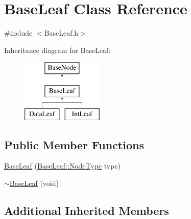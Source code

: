 \hypertarget{class_base_leaf}{\section{Base\-Leaf Class Reference}
\label{class_base_leaf}
}


{\ttfamily \#include $<$Base\-Leaf.\-h$>$}

Inheritance diagram for Base\-Leaf\-:\begin{figure}[H]
\begin{center}
\leavevmode
\includegraphics[height=3.000000cm]{class_base_leaf}
\end{center}
\end{figure}
\subsection*{Public Member Functions}
\begin{DoxyCompactItemize}
\item 
\hyperlink{class_base_leaf_af95b55cfe35a14508e2ac5b440dc26cd}{Base\-Leaf} (\hyperlink{class_base_node_a01f9336072c3fb197a2a0dda45d78544}{Base\-Leaf\-::\-Node\-Type} type)
\item 
\hyperlink{class_base_leaf_a2eccf8145c7985065c4429f218358a7f}{$\sim$\-Base\-Leaf} (void)
\end{DoxyCompactItemize}
\subsection*{Additional Inherited Members}


